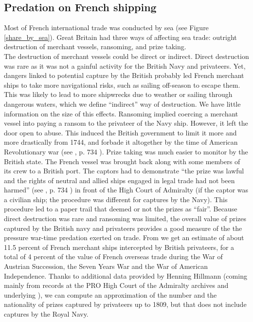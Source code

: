 \documentclass[12pt,a4paper,notitlepage,english]{article}
\begin{document}
\subsection{Predation on French shipping}\label{sec:DestructionofFrenchshipping}
Most of French international trade was conducted by sea (see Figure \ref{share_by_sea}). 
Great Britain had three ways of affecting sea trade: outright destruction of merchant vessels, ransoming, and prize taking.\\
The destruction of merchant vessels could be direct or indirect. Direct destruction was rare as it was not a gainful activity for the British Navy and privateers.
Yet, dangers linked to potential capture by the British probably led French merchant ships to take more navigational risks, such as sailing off-season to escape them. This was likely to lead to more shipwrecks due to weather or sailing through dangerous waters, which we define ``indirect'' way of destruction. We have little information on the size of this effects.
Ransoming implied coercing a merchant vessel into paying a ransom to the privateer of the Navy ship. However, it left the door open to abuse. This induced the British government to limit it more and more drastically from 1744, and forbade it altogether by the time of American Revolutionary war (see \cite{Hillmann2011}, p. 734 ). 
Prize taking was much easier to monitor by the British state.
The French vessel was brought back along with some members of its crew to a British port.
The captors had to demonstrate ``the prize was lawful and the rights of neutral and allied ships engaged in legal trade had not been harmed'' (see \cite{Hillmann2011}, p. 734 ) in front of the High Court of Admiralty (if the captor was a civilian ship; the procedure was different for captures by the Navy).
This procedure led to a paper trail that deemed or not the prizes as ``fair''.
Because direct destruction was rare and ransoming was limited, the overall value of prizes captured by the British navy and privateers provides a good measure of the the pressure war-time predation exerted on trade.
From \cite{Hillmann2011} we get an estimate of about 11.5 percent of French merchant ships intercepted by British privateers, for a total of 4 percent of the value of French overseas trade during the War of Austrian Succession, the Seven Years War and the War of American Independence.
Thanks to additional data provided by Henning Hillmann (coming mainly from records at the PRO High Court of the Admiralty archives and underlying \cite{Hillmann2011}), we can compute an approximation of the number and the nationality of prizes captured by privateers up to 1809, but that does not include captures by the Royal Navy. 
\end{document}
